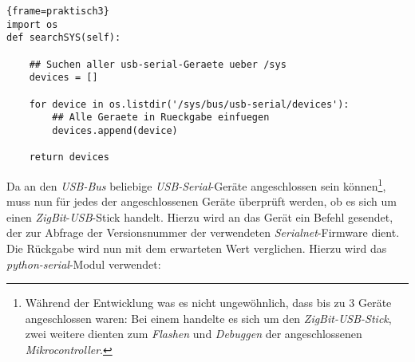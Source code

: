 \begin{lstlisting}{frame=praktisch3}
import os
def searchSYS(self):

    ## Suchen aller usb-serial-Geraete ueber /sys 
    devices = []

    for device in os.listdir('/sys/bus/usb-serial/devices'):
        ## Alle Geraete in Rueckgabe einfuegen
        devices.append(device)

    return devices
\end{lstlisting}

Da an den \emph{USB-Bus} beliebige \emph{USB-Serial}-Geräte angeschlossen sein können\footnote{Während der Entwicklung
was es nicht ungewöhnlich, dass bis zu 3 Geräte angeschlossen waren: Bei einem handelte es sich um den
\emph{ZigBit-USB-Stick}, zwei weitere dienten zum \emph{Flashen} und \emph{Debuggen} der angeschlossenen 
\emph{Mikrocontroller}.}, 
muss nun für jedes der angeschlossenen Geräte überprüft werden, ob es sich um einen \emph{ZigBit}-\emph{USB}-Stick
handelt. Hierzu wird an das Gerät ein Befehl gesendet, der zur Abfrage der Versionsnummer der verwendeten
\emph{Serialnet}-Firmware dient. Die Rückgabe wird nun mit dem erwarteten Wert verglichen. Hierzu wird das
\emph{python-serial}-Modul verwendet:

